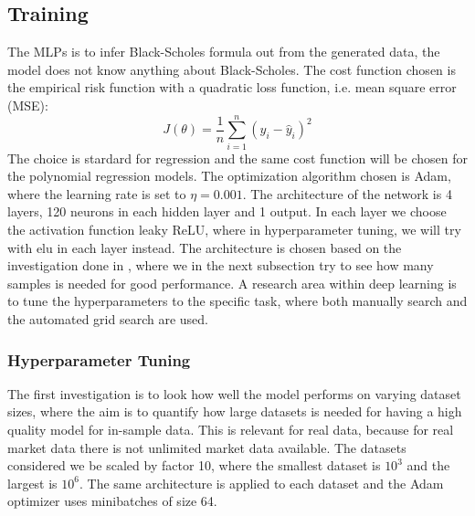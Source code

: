 \subsection{Training}
The MLPs is to infer Black-Scholes formula out from the generated data, the model does not know anything about Black-Scholes. The cost function chosen is the empirical risk function with a quadratic loss function, i.e. mean square error (MSE):
$$J(\theta)= \frac{1}{n} \sum_{i=1}^{n}(y_i-\hat{y}_i)^2$$
The choice is stardard for regression and the same cost function will be chosen for the polynomial regression models. The optimization algorithm chosen is Adam, where the learning rate is set to $\eta=0.001$. The architecture of the network is 4 layers, 120 neurons in each hidden layer and 1 output. In each layer we choose the activation function leaky ReLU, where in hyperparameter tuning, we will try with elu in each layer instead. The architecture is chosen based on the investigation done in  \parencite{HirsaAli2019}, where we in the next subsection try to see how many samples is needed for good performance. A research area within deep learning is to tune the hyperparameters to the specific task, where both manually search and the automated grid search are used. 

\subsubsection{Hyperparameter Tuning}
The first investigation is to look how well the model performs on varying dataset sizes, where the aim is to quantify how large datasets is needed for having a high quality model for in-sample data. This is relevant for real data, because for real market data there is not unlimited market data available. The datasets considered we be scaled by factor 10, where the smallest dataset is $10^3$ and the largest is $10^6$. The same architecture is applied to each dataset and the Adam optimizer uses minibatches of size 64.

